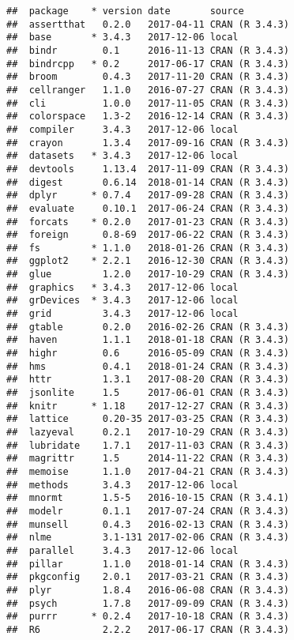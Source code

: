 \documentclass{article}\usepackage[]{graphicx}\usepackage[]{color}
\makeatletter
\newenvironment{kframe}{%
 \def\at@end@of@kframe{}%
 \ifinner\ifhmode%
  \def\at@end@of@kframe{\end{minipage}}%
  \begin{minipage}{\columnwidth}%
 \fi\fi%
 \def\FrameCommand##1{\hskip\@totalleftmargin \hskip-\fboxsep
 \colorbox{shadecolor}{##1}\hskip-\fboxsep
     \hskip-\linewidth \hskip-\@totalleftmargin \hskip\columnwidth}%
 \MakeFramed {\advance\hsize-\width
   \@totalleftmargin\z@ \linewidth\hsize
   \@setminipage}}%
 {\par\unskip\endMakeFramed%
 \at@end@of@kframe}
\newenvironment{knitrout}{}{} %
\makeatother
\begin{document}
\begin{knitrout}
\begin{kframe}
{\ttfamily\noindent\itshape\color{messagecolor}{\#\# Packages --------------------------------------------------------------------------------}}\begin{verbatim}
##  package    * version date       source        
##  assertthat   0.2.0   2017-04-11 CRAN (R 3.4.3)
##  base       * 3.4.3   2017-12-06 local         
##  bindr        0.1     2016-11-13 CRAN (R 3.4.3)
##  bindrcpp   * 0.2     2017-06-17 CRAN (R 3.4.3)
##  broom        0.4.3   2017-11-20 CRAN (R 3.4.3)
##  cellranger   1.1.0   2016-07-27 CRAN (R 3.4.3)
##  cli          1.0.0   2017-11-05 CRAN (R 3.4.3)
##  colorspace   1.3-2   2016-12-14 CRAN (R 3.4.3)
##  compiler     3.4.3   2017-12-06 local         
##  crayon       1.3.4   2017-09-16 CRAN (R 3.4.3)
##  datasets   * 3.4.3   2017-12-06 local         
##  devtools     1.13.4  2017-11-09 CRAN (R 3.4.3)
##  digest       0.6.14  2018-01-14 CRAN (R 3.4.3)
##  dplyr      * 0.7.4   2017-09-28 CRAN (R 3.4.3)
##  evaluate     0.10.1  2017-06-24 CRAN (R 3.4.3)
##  forcats    * 0.2.0   2017-01-23 CRAN (R 3.4.3)
##  foreign      0.8-69  2017-06-22 CRAN (R 3.4.3)
##  fs         * 1.1.0   2018-01-26 CRAN (R 3.4.3)
##  ggplot2    * 2.2.1   2016-12-30 CRAN (R 3.4.3)
##  glue         1.2.0   2017-10-29 CRAN (R 3.4.3)
##  graphics   * 3.4.3   2017-12-06 local         
##  grDevices  * 3.4.3   2017-12-06 local         
##  grid         3.4.3   2017-12-06 local         
##  gtable       0.2.0   2016-02-26 CRAN (R 3.4.3)
##  haven        1.1.1   2018-01-18 CRAN (R 3.4.3)
##  highr        0.6     2016-05-09 CRAN (R 3.4.3)
##  hms          0.4.1   2018-01-24 CRAN (R 3.4.3)
##  httr         1.3.1   2017-08-20 CRAN (R 3.4.3)
##  jsonlite     1.5     2017-06-01 CRAN (R 3.4.3)
##  knitr      * 1.18    2017-12-27 CRAN (R 3.4.3)
##  lattice      0.20-35 2017-03-25 CRAN (R 3.4.3)
##  lazyeval     0.2.1   2017-10-29 CRAN (R 3.4.3)
##  lubridate    1.7.1   2017-11-03 CRAN (R 3.4.3)
##  magrittr     1.5     2014-11-22 CRAN (R 3.4.3)
##  memoise      1.1.0   2017-04-21 CRAN (R 3.4.3)
##  methods      3.4.3   2017-12-06 local         
##  mnormt       1.5-5   2016-10-15 CRAN (R 3.4.1)
##  modelr       0.1.1   2017-07-24 CRAN (R 3.4.3)
##  munsell      0.4.3   2016-02-13 CRAN (R 3.4.3)
##  nlme         3.1-131 2017-02-06 CRAN (R 3.4.3)
##  parallel     3.4.3   2017-12-06 local         
##  pillar       1.1.0   2018-01-14 CRAN (R 3.4.3)
##  pkgconfig    2.0.1   2017-03-21 CRAN (R 3.4.3)
##  plyr         1.8.4   2016-06-08 CRAN (R 3.4.3)
##  psych        1.7.8   2017-09-09 CRAN (R 3.4.3)
##  purrr      * 0.2.4   2017-10-18 CRAN (R 3.4.3)
##  R6           2.2.2   2017-06-17 CRAN (R 3.4.3)

\end{verbatim}
\end{kframe}
\end{knitrout}
\end{document}
